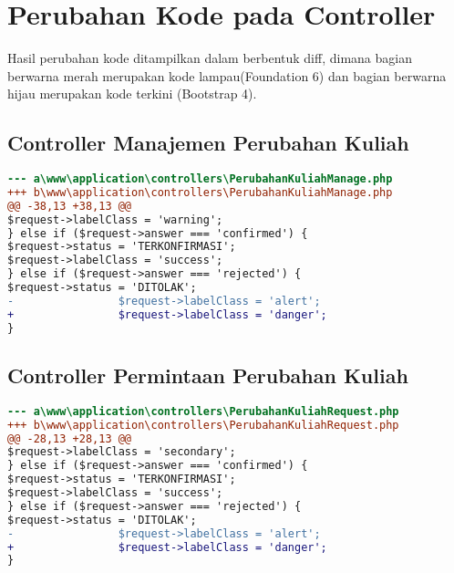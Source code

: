 \section{Perubahan Kode pada Controller}
Hasil perubahan kode ditampilkan dalam berbentuk diff, dimana bagian berwarna merah merupakan kode lampau(Foundation 6) dan bagian berwarna hijau merupakan kode terkini  (Bootstrap 4). 
\subsection{Controller Manajemen Perubahan Kuliah}
\begin{lstlisting}[language=diff, caption=Controller PerubahanKuliahManage, label=Entri, basicstyle=\ttfamily, frame=single,
columns=fullflexible, keepspaces=true, breaklines=true]
--- a\www\application\controllers\PerubahanKuliahManage.php	
+++ b\www\application\controllers\PerubahanKuliahManage.php	
@@ -38,13 +38,13 @@
$request->labelClass = 'warning';
} else if ($request->answer === 'confirmed') {
$request->status = 'TERKONFIRMASI';
$request->labelClass = 'success';
} else if ($request->answer === 'rejected') {
$request->status = 'DITOLAK';
-                $request->labelClass = 'alert';
+                $request->labelClass = 'danger';
}
\end{lstlisting}  

\subsection{Controller Permintaan Perubahan Kuliah}
\begin{lstlisting}[language=diff, caption=Controller Request Perubahan Kuliah, label=Entri, basicstyle=\ttfamily, frame=single,
columns=fullflexible, keepspaces=true, breaklines=true]
--- a\www\application\controllers\PerubahanKuliahRequest.php
+++ b\www\application\controllers\PerubahanKuliahRequest.php
@@ -28,13 +28,13 @@
$request->labelClass = 'secondary';
} else if ($request->answer === 'confirmed') {
$request->status = 'TERKONFIRMASI';
$request->labelClass = 'success';
} else if ($request->answer === 'rejected') {
$request->status = 'DITOLAK';
-                $request->labelClass = 'alert';
+                $request->labelClass = 'danger';
}
\end{lstlisting}

